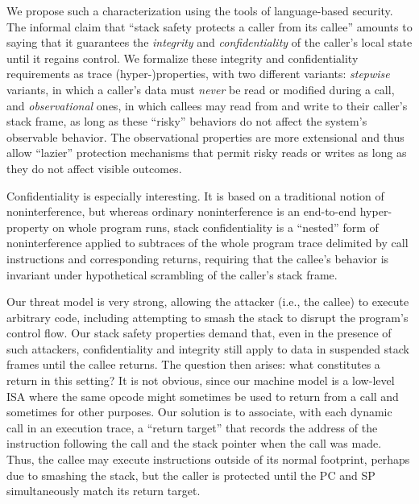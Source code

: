 \documentclass[acmtog,review,anonymous]{acmart}\settopmatter{printfolios=true,printccs=false,printacmref=false}
\begin{document}
We propose such a characterization
using the tools of language-based security. The informal claim that
``stack safety protects a caller from its callee'' amounts to saying
that it guarantees
the {\em integrity} and {\em confidentiality} of the caller's local state
until it regains control.
%
We formalize these integrity and confidentiality requirements as trace
(hyper-)properties, with two different
variants: {\em stepwise} variants, in which a caller's data must {\em never} be
read or modified during a call, and {\em observational} ones, in which
callees may read from and write to their caller's stack frame, as
long as these ``risky'' behaviors do not affect the system's observable
behavior. The observational properties are more extensional and thus
allow ``lazier'' protection mechanisms that permit risky reads or
writes as long as they do not affect visible outcomes.

Confidentiality is especially interesting.  It is based on a traditional
notion of noninterference, but whereas ordinary noninterference is
an end-to-end hyper-property on whole program runs, stack confidentiality is
a ``nested'' form of
noninterference applied to
subtraces of the whole program trace delimited by call instructions and
corresponding returns, requiring that the callee's behavior is invariant
under hypothetical scrambling of the caller's stack frame.

Our threat model is very strong, allowing the attacker (i.e., the callee) to
execute arbitrary code, including attempting to smash
the stack to disrupt the program's control flow.
Our stack safety properties demand that, even in the presence of such
attackers, confidentiality and integrity
still apply to data in suspended stack frames until the callee returns.
The question then arises:
what constitutes a return in this setting? It is not obvious, since
our machine model is a low-level ISA where the same opcode might
sometimes
be used to return from a call and sometimes for other purposes.
Our solution is to associate, with each dynamic call in an execution trace, a
``return target'' that records the address of the instruction following the
call and the stack pointer when the call was made. Thus, the callee may
execute instructions outside of its normal footprint, perhaps due to
smashing the stack, but
the caller is protected until the PC and SP simultaneously match its return
target.
\end{document}
